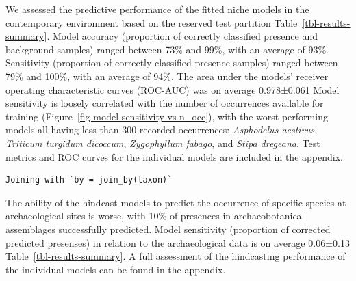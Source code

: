 \documentclass[
  authoryear,
  preprint]{elsarticle}
\begin{document}
We assessed the predictive performance of the fitted niche models in the
contemporary environment based on the reserved test partition
Table~\ref{tbl-results-summary}. Model accuracy (proportion of correctly
classified presence and background samples) ranged between 73\% and
99\%, with an average of 93\%. Sensitivity (proportion of correctly
classified presence samples) ranged between 79\% and 100\%, with an
average of 94\%. The area under the models' receiver operating
characteristic curves (ROC-AUC) was on average 0.978±0.061 Model
sensitivity is loosely correlated with the number of occurrences
available for training (Figure~\ref{fig-model-sensitivity-vs-n_occ}),
with the worst-performing models all having less than 300 recorded
occurrences: \emph{Asphodelus aestivus}, \emph{Triticum turgidum
dicoccum}, \emph{Zygophyllum fabago}, and \emph{Stipa dregeana}. Test
metrics and ROC curves for the individual models are included in the
appendix.

\begin{verbatim}
Joining with `by = join_by(taxon)`
\end{verbatim}

The ability of the hindcast models to predict the occurrence of specific
species at archaeological sites is worse, with 10\% of presences in
archaeobotanical assemblages successfully predicted. Model sensitivity
(proportion of corrected predicted presenses) in relation to the
archaeological data is on average 0.06±0.13
Table~\ref{tbl-results-summary}. A full assessment of the hindcasting
performance of the individual models can be found in the appendix.

\begingroup
\setlength{}
\setlength{}\fontsize{8.2pt}{9.9pt}\selectfont
\setlength{\LTpost}{0mm}
\end{document}
